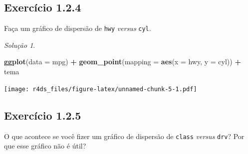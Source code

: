 \documentclass[
]{latex/krantz}
\newenvironment{Shaded}{\begin{snugshade}}{\end{snugshade}}
\newcommand{\AttributeTok}[1]{\textcolor[rgb]{0.13,0.29,0.53}{#1}}
\newcommand{\FunctionTok}[1]{\textcolor[rgb]{0.13,0.29,0.53}{\textbf{#1}}}
\newcommand{\NormalTok}[1]{#1}
\newcommand{\SpecialCharTok}[1]{\textcolor[rgb]{0.81,0.36,0.00}{\textbf{#1}}}
\theoremstyle{definition}
\theoremstyle{definition}
\theoremstyle{definition}
\theoremstyle{definition}
\theoremstyle{remark}
\newtheorem*{solution}{Solução}
\begin{document}
\hypertarget{ex1-2-4}{%
\subsection*{Exercício 1.2.4}\label{ex1-2-4}}

Faça um gráfico de dispersão de \texttt{hwy} \emph{versus} \texttt{cyl}.

\begin{solution}
\leavevmode

\begin{Shaded}
\begin{Highlighting}[]
\FunctionTok{ggplot}\NormalTok{(}\AttributeTok{data =}\NormalTok{ mpg) }\SpecialCharTok{+}
    \FunctionTok{geom\_point}\NormalTok{(}\AttributeTok{mapping =} \FunctionTok{aes}\NormalTok{(}\AttributeTok{x =}\NormalTok{ hwy, }\AttributeTok{y =}\NormalTok{ cyl)) }\SpecialCharTok{+}
\NormalTok{    tema}
\end{Highlighting}
\end{Shaded}

\texttt{[image: r4ds\_files/figure-latex/unnamed-chunk-5-1.pdf]}

\end{solution}

\hypertarget{exr1-2-5}{%
\subsection*{Exercício 1.2.5}\label{exr1-2-5}}

O que acontece se você fizer um gráfico de dispersão de \texttt{class} \emph{versus} \texttt{drv}? Por que esse gráfico não é útil?
\end{document}
